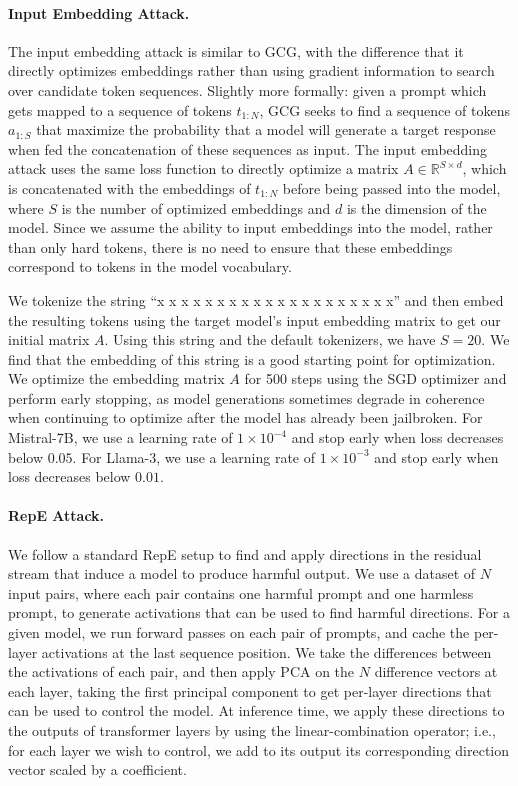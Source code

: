 \paragraph{Input Embedding Attack.}

The input embedding attack is similar to GCG, with the difference that it directly optimizes embeddings rather than using gradient information to search over candidate token sequences. Slightly more formally: given a prompt which gets mapped to a sequence of tokens $t_{1:N}$, GCG seeks to find a sequence of tokens $a_{1:S}$ that maximize the probability that a model will generate a target response when fed the concatenation of these sequences as input. The input embedding attack uses the same loss function to directly optimize a matrix $A \in \mathbb{R}^{S \times d}$, which is concatenated with the embeddings of $t_{1:N}$ before being passed into the model, where $S$ is the number of optimized embeddings and $d$ is the dimension of the model. Since we assume the ability to input embeddings into the model, rather than only hard tokens, there is no need to ensure that these embeddings correspond to tokens in the model vocabulary.

We tokenize the string ``x x x x x x x x x x x x x x x x x x x x'' and then embed the resulting tokens using the target model's input embedding matrix to get our initial matrix $A$. Using this string and the default tokenizers, we have $S=20$. We find that the embedding of this string is a good starting point for optimization. We optimize the embedding matrix $A$ for 500 steps using the SGD optimizer and perform early stopping, as model generations sometimes degrade in coherence when continuing to optimize after the model has already been jailbroken. For Mistral-7B, we use a learning rate of $1\times10^{-4}$ and stop early when loss decreases below $0.05$. For Llama-3, we use a learning rate of $1\times10^{-3}$ and stop early when loss decreases below $0.01$.

\paragraph{RepE Attack.}

We follow a standard RepE setup to find and apply directions in the residual stream that induce a model to produce harmful output. We use a dataset of $N$ input pairs, where each pair contains one harmful prompt and one harmless prompt, to generate activations that can be used to find harmful directions. For a given model, we run forward passes on each pair of prompts, and cache the per-layer activations at the last sequence position. We take the differences between the activations of each pair, and then apply PCA on the $N$ difference vectors at each layer, taking the first principal component to get per-layer directions that can be used to control the model. At inference time, we apply these directions to the outputs of transformer layers by using the linear-combination operator; i.e., for each layer we wish to control, we add to its output its corresponding direction vector scaled by a coefficient.


